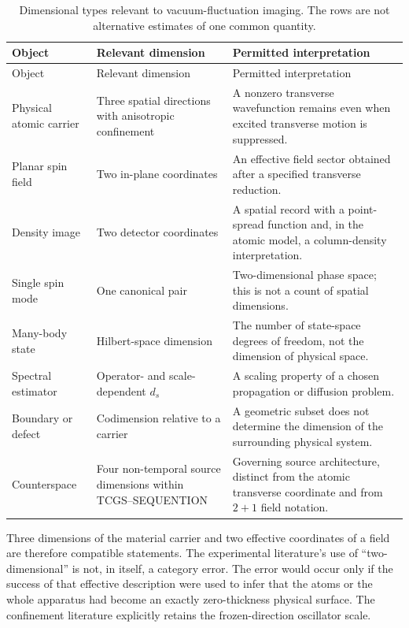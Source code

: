 \documentclass[11pt,a4paper]{article}
\theoremstyle{definition}
\theoremstyle{remark}
\newcommand{\TCGS}{TCGS--SEQUENTION}
\begin{document}
\begin{longtable}{@{}L{0.19\textwidth}L{0.31\textwidth}L{0.43\textwidth}@{}}
\caption{Dimensional types relevant to vacuum-fluctuation imaging. The rows are not alternative estimates of one common quantity.\label{tab:dimensions}}\\
\toprule Object & Relevant dimension & Permitted interpretation\\\midrule
\endfirsthead
\toprule Object & Relevant dimension & Permitted interpretation\\\midrule
\endhead
\bottomrule\endfoot
Physical atomic carrier & Three spatial directions with anisotropic confinement & A nonzero transverse wavefunction remains even when excited transverse motion is suppressed.\\
Planar spin field & Two in-plane coordinates & An effective field sector obtained after a specified transverse reduction.\\
Density image & Two detector coordinates & A spatial record with a point-spread function and, in the atomic model, a column-density interpretation.\\
Single spin mode & One canonical pair & Two-dimensional phase space; this is not a count of spatial dimensions.\\
Many-body state & Hilbert-space dimension & The number of state-space degrees of freedom, not the dimension of physical space.\\
Spectral estimator & Operator- and scale-dependent $d_s$ & A scaling property of a chosen propagation or diffusion problem.\\
Boundary or defect & Codimension relative to a carrier & A geometric subset does not determine the dimension of the surrounding physical system.\\
Counterspace & Four non-temporal source dimensions within \TCGS & Governing source architecture, distinct from the atomic transverse coordinate and from $2+1$ field notation.\\
\end{longtable}

Three dimensions of the material carrier and two effective coordinates of a field are therefore compatible statements. The experimental literature's use of ``two-dimensional'' is not, in itself, a category error. The error would occur only if the success of that effective description were used to infer that the atoms or the whole apparatus had become an exactly zero-thickness physical surface. The confinement literature explicitly retains the frozen-direction oscillator scale.\cite{hadzibabic,petrov}
\end{document}
